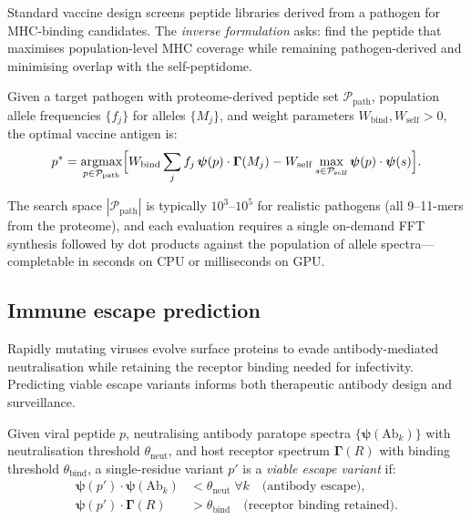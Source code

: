 Standard vaccine design screens peptide libraries derived from a pathogen for
MHC-binding candidates. The \emph{inverse formulation} asks: find the peptide
that maximises population-level MHC coverage while remaining pathogen-derived
and minimising overlap with the self-peptidome.

\begin{definition}
\label{im:def:vaccine}
Given a target pathogen with proteome-derived peptide set
$\mathcal{P}_{\mathrm{path}}$, population allele frequencies $\{f_j\}$ for
alleles $\{M_j\}$, and weight parameters $W_{\mathrm{bind}},
W_{\mathrm{self}} > 0$, the optimal vaccine antigen is:
\begin{equation}
  p^* = \operatorname*{argmax}_{p \in \mathcal{P}_{\mathrm{path}}}
  \Bigl[W_{\mathrm{bind}}\sum_j f_j\,\bm{\psi}(p)\cdot\bm{\Gamma}(M_j)
        - W_{\mathrm{self}}\max_{s \in \mathcal{P}_{\mathrm{self}}}
          \bm{\psi}(p)\cdot\bm{\psi}(s)\Bigr].
  \label{im:eq:vaccine_objective}
\end{equation}
\end{definition}

The search space $|\mathcal{P}_{\mathrm{path}}|$ is typically $10^3$--$10^5$
for realistic pathogens (all 9--11-mers from the proteome), and each
evaluation requires a single on-demand FFT synthesis followed by dot products
against the population of allele spectra---completable in seconds on CPU or
milliseconds on GPU.

\subsection{Immune escape prediction}
\label{im:sec:escape}

Rapidly mutating viruses evolve surface proteins to evade antibody-mediated
neutralisation while retaining the receptor binding needed for infectivity.
Predicting viable escape variants informs both therapeutic antibody design and
surveillance.

\begin{definition}
\label{im:def:escape}
Given viral peptide $p$, neutralising antibody paratope spectra
$\{\bm{\psi}(\mathrm{Ab}_k)\}$ with neutralisation threshold
$\theta_{\mathrm{neut}}$, and host receptor spectrum $\bm{\Gamma}(R)$ with
binding threshold $\theta_{\mathrm{bind}}$, a single-residue variant $p'$
is a \emph{viable escape variant} if:
\begin{align}
  \bm{\psi}(p')\cdot\bm{\psi}(\mathrm{Ab}_k)
    &< \theta_{\mathrm{neut}} \;\forall k
    \quad\text{(antibody escape)},
    \label{im:eq:escape_ab}\\
  \bm{\psi}(p')\cdot\bm{\Gamma}(R)
    &> \theta_{\mathrm{bind}}
    \quad\text{(receptor binding retained)}.
    \label{im:eq:escape_bind}
\end{align}
\end{definition}

